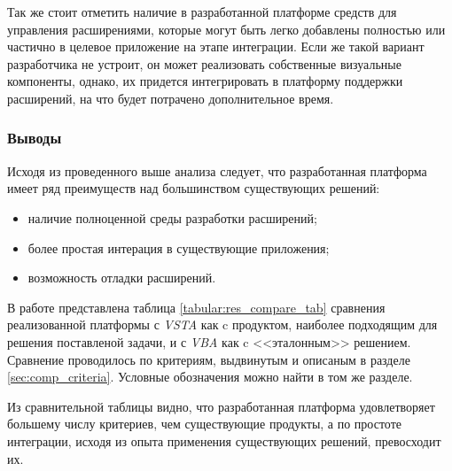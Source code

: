 Так же стоит отметить наличие в разработанной платформе средств для управления расширениями, которые могут быть легко добавлены полностью или частично в целевое приложение на этапе интеграции. Если же такой вариант разработчика не устроит, он может реализовать собственные визуальные компоненты, однако, их придется интегрировать в платформу поддержки расширений, на что будет потрачено дополнительное время.

\subsubsection{Выводы}

Исходя из проведенного выше анализа следует, что разработанная платформа имеет ряд преимуществ над большинством существующих решений:

\begin{itemize}
   \item наличие полноценной среды разработки расширений;
   \item более простая интерация в существующие приложения;
   \item возможность отладки расширений.
\end{itemize}

В работе представлена таблица \ref{tabular:res_compare_tab} сравнения реализованной платформы с {\it VSTA} как c продуктом, наиболее подходящим для решения поставленой задачи, и с {\it VBA} как c <<эталонным>> решением. Сравнение проводилось по критериям, выдвинутым и описаным в разделе \ref{sec:comp_criteria}. Условные обозначения можно найти в том же разделе.



Из сравнительной таблицы видно, что разработанная платформа удовлетворяет большему числу критериев, чем существующие продукты, а по простоте интеграции, исходя из опыта применения существующих решений, превосходит их.

\pagebreak
